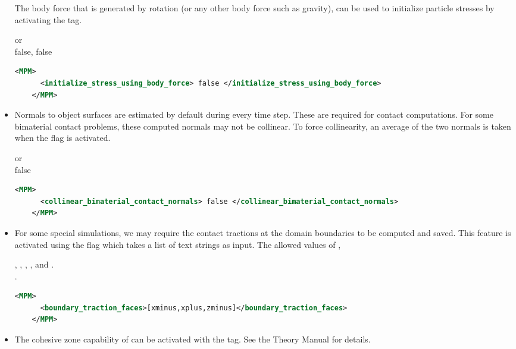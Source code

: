 \begin{itemize}
    The body force that is generated by rotation (or any other body force such as
    gravity), can be used to initialize particle stresses by activating 
    the  tag.

      or \\
     false, false
    \begin{lstlisting}[language=XML]
    <MPM>
      <initialize_stress_using_body_force> false </initialize_stress_using_body_force>
    </MPM>
    \end{lstlisting}

  \item {}  Normals to object surfaces are estimated
    by default during every time step.  These are required for contact computations.
    For some bimaterial contact problems, these computed normals may not be 
    collinear.  To force collinearity, an average of the two normals is taken
    when the  flag is activated.
    
      or \\
     false
    \begin{lstlisting}[language=XML]
    <MPM>
      <collinear_bimaterial_contact_normals> false </collinear_bimaterial_contact_normals>
    </MPM>
    \end{lstlisting}

  \item {}  For some special simulations, we
    may require the contact tractions at the domain boundaries to be
    computed and saved.  This feature is activated using the
     flag which takes a list of
    text strings as input.  The allowed values of ,

     , , , ,
    and . \\
     \Textsfc{[]}.
    \begin{lstlisting}[language=XML]
    <MPM>
      <boundary_traction_faces>[xminus,xplus,zminus]</boundary_traction_faces>
    </MPM>
    \end{lstlisting}

  \item {}  The cohesive zone capability of \Vaango can be
    activated with the  tag.  See the \Vaango Theory
    Manual for details.


\end{itemize}

